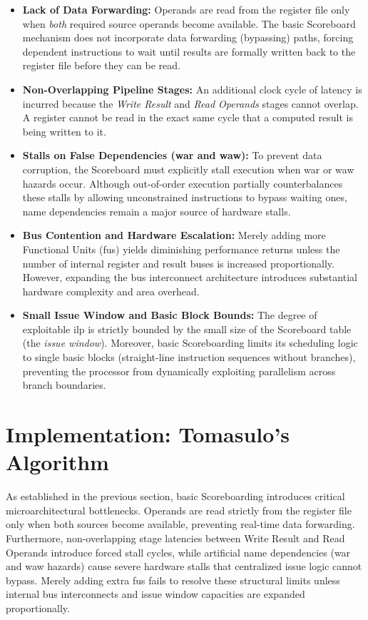 \begin{itemize}
    \item \textbf{Lack of Data Forwarding:} Operands are read from the register file only when \textit{both} required source operands become available. The basic Scoreboard mechanism does not incorporate data forwarding (bypassing) paths, forcing dependent instructions to wait until results are formally written back to the register file before they can be read.
    \item \textbf{Non-Overlapping Pipeline Stages:} An additional clock cycle of latency is incurred because the \textit{Write Result} and \textit{Read Operands} stages cannot overlap. A register cannot be read in the exact same cycle that a computed result is being written to it.
    \item \textbf{Stalls on False Dependencies (\gls{war} and \gls{waw}):} To prevent data corruption, the Scoreboard must explicitly stall execution when \gls{war} or \gls{waw} hazards occur. Although out-of-order execution partially counterbalances these stalls by allowing unconstrained instructions to bypass waiting ones, name dependencies remain a major source of hardware stalls.
    \item \textbf{Bus Contention and Hardware Escalation:} Merely adding more Functional Units (\glspl{fu}) yields diminishing performance returns unless the number of internal register and result buses is increased proportionally. However, expanding the bus interconnect architecture introduces substantial hardware complexity and area overhead.
    \item \textbf{Small Issue Window and Basic Block Bounds:} The degree of exploitable \gls{ilp} is strictly bounded by the small size of the Scoreboard table (the \textit{issue window}). Moreover, basic Scoreboarding limits its scheduling logic to single basic blocks (straight-line instruction sequences without branches), preventing the processor from dynamically exploiting parallelism across branch boundaries.
\end{itemize}

\section{Implementation: Tomasulo's Algorithm}
\label{sec:tomasulo_algorithm}

As established in the previous section, basic Scoreboarding introduces critical microarchitectural bottlenecks. Operands are read strictly from the register file only when both sources become available, preventing real-time data forwarding. Furthermore, non-overlapping stage latencies between Write Result and Read Operands introduce forced stall cycles, while artificial name dependencies (\gls{war} and \gls{waw} hazards) cause severe hardware stalls that centralized issue logic cannot bypass. Merely adding extra \glspl{fu} fails to resolve these structural limits unless internal bus interconnects and issue window capacities are expanded proportionally.

